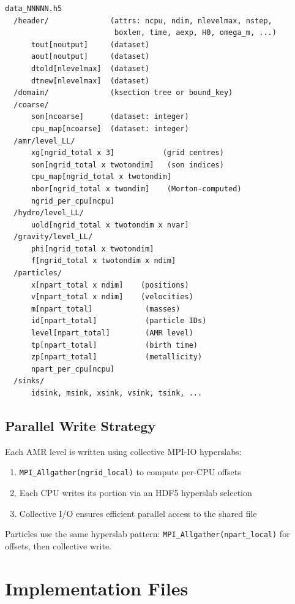 \documentclass[11pt,fleqn]{book}
\begin{document}
\begin{lstlisting}[style=bash,numbers=none]
data_NNNNN.h5
  /header/              (attrs: ncpu, ndim, nlevelmax, nstep,
                         boxlen, time, aexp, H0, omega_m, ...)
      tout[noutput]     (dataset)
      aout[noutput]     (dataset)
      dtold[nlevelmax]  (dataset)
      dtnew[nlevelmax]  (dataset)
  /domain/              (ksection tree or bound_key)
  /coarse/
      son[ncoarse]      (dataset: integer)
      cpu_map[ncoarse]  (dataset: integer)
  /amr/level_LL/
      xg[ngrid_total x 3]           (grid centres)
      son[ngrid_total x twotondim]   (son indices)
      cpu_map[ngrid_total x twotondim]
      nbor[ngrid_total x twondim]    (Morton-computed)
      ngrid_per_cpu[ncpu]
  /hydro/level_LL/
      uold[ngrid_total x twotondim x nvar]
  /gravity/level_LL/
      phi[ngrid_total x twotondim]
      f[ngrid_total x twotondim x ndim]
  /particles/
      x[npart_total x ndim]    (positions)
      v[npart_total x ndim]    (velocities)
      m[npart_total]            (masses)
      id[npart_total]           (particle IDs)
      level[npart_total]        (AMR level)
      tp[npart_total]           (birth time)
      zp[npart_total]           (metallicity)
      npart_per_cpu[ncpu]
  /sinks/
      idsink, msink, xsink, vsink, tsink, ...
\end{lstlisting}

\subsection{Parallel Write Strategy}

Each AMR level is written using collective MPI-IO hyperslabs:

\begin{enumerate}
  \item \texttt{MPI\_Allgather(ngrid\_local)} to compute per-CPU offsets
  \item Each CPU writes its portion via an HDF5 hyperslab selection
  \item Collective I/O ensures efficient parallel access to the shared file
\end{enumerate}

Particles use the same hyperslab pattern: \texttt{MPI\_Allgather(npart\_local)} for offsets, then collective write.


\section{Implementation Files}
\end{document}
